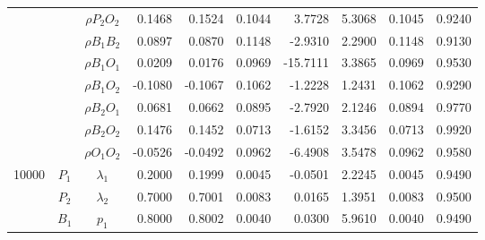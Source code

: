 \documentclass[letterpaper]{article}
\begin{document}
\begin{table}[h]
\begin{tabular}{cccrrrrrrr}
            &             & $\rho{P_2O_2}$ & 0.1468                 & 0.1524                 & 0.1044                 & 3.7728                 & 5.3068                 & 0.1045                   & 0.9240                 \\
            &             & $\rho{B_1B_2}$ & 0.0897                 & 0.0870                 & 0.1148                 & -2.9310                & 2.2900                 & 0.1148                   & 0.9130                 \\
            &             & $\rho{B_1O_1}$ & 0.0209                 & 0.0176                 & 0.0969                 & -15.7111               & 3.3865                 & 0.0969                   & 0.9530                 \\
            &             & $\rho{B_1O_2}$ & -0.1080                & -0.1067                & 0.1062                 & -1.2228                & 1.2431                 & 0.1062                   & 0.9290                 \\
            &             & $\rho{B_2O_1}$ & 0.0681                 & 0.0662                 & 0.0895                 & -2.7920                & 2.1246                 & 0.0894                   & 0.9770                 \\
            &             & $\rho{B_2O_2}$ & 0.1476                 & 0.1452                 & 0.0713                 & -1.6152                & 3.3456                 & 0.0713                   & 0.9920                 \\
            &             & $\rho{O_1O_2}$ & -0.0526                & -0.0492                & 0.0962                 & -6.4908                & 3.5478                 & 0.0962                   & 0.9580                 \\\hline
10000       & $P_1$       & $\lambda_1$    & 0.2000                 & 0.1999                 & 0.0045                 & -0.0501                & 2.2245                 & 0.0045                   & 0.9490                 \\
            & $P_2$       & $\lambda_2$    & 0.7000                 & 0.7001                 & 0.0083                 & 0.0165                 & 1.3951                 & 0.0083                   & 0.9500                 \\
            & $B_1$       & $p_1$          & 0.8000                 & 0.8002                 & 0.0040                 & 0.0300                 & 5.9610                 & 0.0040                   & 0.9490                 \\

\end{tabular}
\end{table}
\end{document}
